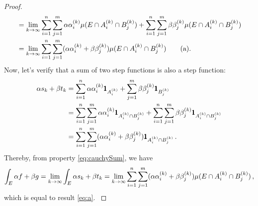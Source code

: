 \begin{proof}
{\begin{align*}
&=\lim_{k\to\infty}\sum_{i=1}^n\sum_{j=1}^m\alpha\alpha_i^{(k)}\mu(E\cap A_i^{(k)}\cap B_j^{(k)}) + \sum_{i=1}^n\sum_{j=1}^m\beta\beta_j^{(k)}\mu(E\cap A_i^{(k)}\cap B_j^{(k)})\\
&=\lim_{k\to\infty}\sum_{i=1}^n\sum_{j=1}^m(\alpha\alpha_i^{(k)}+\beta\beta_j^{(k)})\mu(E\cap A_i^{(k)}\cap B_j^{(k)})\tag{a}\label{eq:a}.
\end{align*}
Now, let's verify that a sum of two step functions is also a step function:
\begin{align*}
\alpha s_k+\beta t_k&=\sum_{{i}=1}^n\alpha\alpha^{(k)}_i\pmb{1}_{A_i^{(k)}}+\sum_{{j}=1}^m\beta\beta^{(k)}_j\pmb{1}_{B_j^{(k)}}\\
&=\sum_{{i}=1}^n\sum_{{j}=1}^m\alpha\alpha^{(k)}_i\pmb{1}_{A_i^{(k)}\cap B_j^{(k)}}+\sum_{{i}=1}^n\sum_{{j}=1}^m\beta\beta^{(k)}_j\pmb{1}_{A_i^{(k)}\cap B_j^{(k)}}\\
&=\sum_{{i}=1}^n\sum_{{j}=1}^m(\alpha\alpha_i^{(k)}+\beta\beta_j^{(k)})\pmb{1}_{A_i^{(k)}\cap B_j^{(k)}}\,.
\end{align*}
Thereby, from  property \eqref{eq:cauchySum}, we have
\begin{equation*}
\int_E \alpha f+\beta g = \lim_{k\to\infty}\int_E\alpha s_k+\beta t_k = \lim_{k\to\infty}\sum_{i=1}^n\sum_{j=1}^m(\alpha\alpha_i^{(k)}+\beta\beta_j^{(k)})\mu(E\cap A_i^{(k)}\cap B_j^{(k)})\,,
\end{equation*}
which is equal to result \eqref{eq:a}.
}\end{proof}


